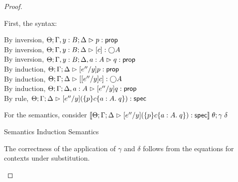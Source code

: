 \begin{proof}
\begin{enumerate}
  First, the syntax:
  \begin{tabbedproof}
    \oo By inversion, $\judgeA[\Theta; \Gamma, y:B; \Delta]{p}{\assert}$ \\
    \oo By inversion, $\judgeA[\Theta; \Gamma, y:B; \Delta]{\comp{c}}{\monad{A}}$ \\
    \oo By inversion, $\judgeA[\Theta; \Gamma, y:B; \Delta, a:A]{q}{\assert}$ \\
    \oo By induction, $\judgeA[\Theta; \Gamma; \Delta]{[e''/y]p}{\assert}$ \\
    \oo By induction, $\judgeA[\Theta; \Gamma; \Delta]{\comp{[e''/y]c}}{\monad{A}}$ \\
    \oo By induction, $\judgeA[\Theta; \Gamma; \Delta, a:A]{[e''/y]q}{\assert}$ \\
    \oo By rule, $\judgeS[\Theta; \Gamma; \Delta]{[e''/y](\spec{p}{c}{a:A}{q})}$
  \end{tabbedproof}

  For the semantics, consider $\interp{\judgeS[\Theta; \Gamma; \Delta]{[e''/y](\spec{p}{c}{a:A}{q})}}\;\theta;\gamma\;\delta$
  \begin{eqnproof}
          {Semantics}
          {Induction}
          {Semantics}
  \end{eqnproof}
  The correctness of the application of $\gamma$ and $\delta$ follows from the equations for
  contexts under substitution. 


\end{enumerate}
\end{proof}
